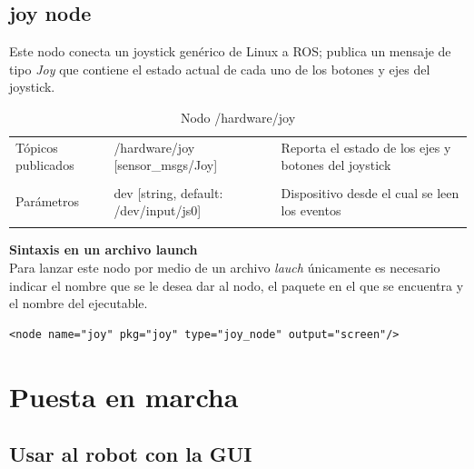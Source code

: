 \documentclass[a4paper,usenames,dvipsnames,svgnames,table]{book}
\begin{document}
\subsection{joy node}

Este nodo conecta un joystick genérico de Linux a ROS; publica un mensaje de tipo \textit{Joy} que contiene el estado actual de cada uno de los botones y ejes del joystick.

\begin{table}[H]
\begin{center}
\begin{tabular}{|l|p{6.5cm}|p{4.5cm}|}%
\hline

Tópicos publicados
& /hardware/joy [sensor\_msgs/Joy] & Reporta el estado de los ejes y botones del joystick \\
& & \\
\hline

Parámetros
&  dev [string, default: /dev/input/js0] & Dispositivo desde el cual se leen los eventos \\
& & \\
\hline

\end{tabular}
\caption{Nodo /hardware/joy}
\label{joy node}
\end{center}
\end{table}

\textbf{Sintaxis en un archivo launch}\\
Para lanzar este nodo por medio de un archivo \textit{lauch} únicamente es necesario indicar el nombre que se le desea dar al nodo, el paquete en el que se encuentra y el nombre del ejecutable.
\\
\begin{verbatim}
<node name="joy" pkg="joy" type="joy_node" output="screen"/>
\end{verbatim}

\section{Puesta en marcha}
\subsection{Usar al robot con la GUI}
\label{sec:GUI}
\end{document}
